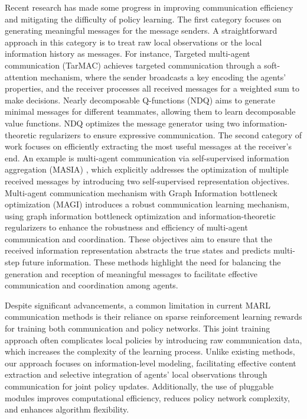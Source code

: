 Recent research has made some progress in improving communication efficiency and mitigating the difficulty of policy learning. The first category focuses on generating meaningful messages for the message senders. A straightforward approach in this category is to treat raw local observations or the local information history as messages. For instance, Targeted multi-agent communication (TarMAC) \cite{das2019tarmac} achieves targeted communication through a soft-attention mechanism, where the sender broadcasts a key encoding the agents' properties, and the receiver processes all received messages for a weighted sum to make decisions. Nearly decomposable Q-functions (NDQ) \cite{wang2019learning} aims to generate minimal messages for different teammates, allowing them to learn decomposable value functions. NDQ optimizes the message generator using two information-theoretic regularizers to ensure expressive communication. The second category of work focuses on efficiently extracting the most useful messages at the receiver's end. An example is multi-agent communication via self-supervised information aggregation (MASIA) \cite{guan2022efficient}, which explicitly addresses the optimization of multiple received messages by introducing two self-supervised representation objectives. Multi-agent communication mechanism with Graph Information bottleneck optimization (MAGI) \cite{ding2023robust} introduces a robust communication learning mechanism, using graph information bottleneck optimization and information-theoretic regularizers to enhance the robustness and efficiency of multi-agent communication and coordination. These objectives aim to ensure that the received information representation abstracts the true states and predicts multi-step future information. These methods highlight the need for balancing the generation and reception of meaningful messages to facilitate effective communication and coordination among agents.

Despite significant advancements, a common limitation in current MARL communication methods is their reliance on sparse reinforcement learning rewards for training both communication and policy networks. This joint training approach often complicates local policies by introducing raw communication data, which increases the complexity of the learning process. Unlike existing methods, our approach focuses on information-level modeling, facilitating effective content extraction and selective integration of agents' local observations through communication for joint policy updates. Additionally, the use of pluggable modules improves computational efficiency, reduces policy network complexity, and enhances algorithm flexibility.


